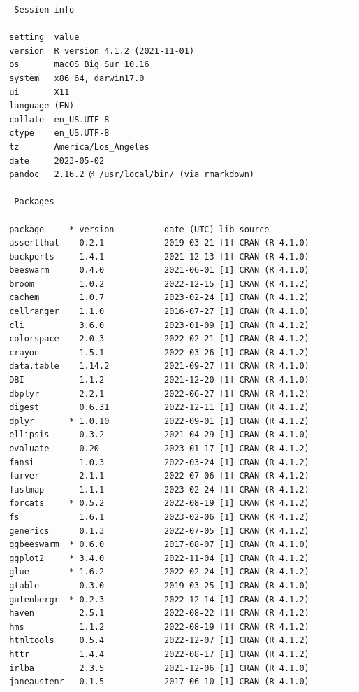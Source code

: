 \documentclass[
]{article}
\begin{document}
\begin{verbatim}
- Session info ---------------------------------------------------------------
 setting  value
 version  R version 4.1.2 (2021-11-01)
 os       macOS Big Sur 10.16
 system   x86_64, darwin17.0
 ui       X11
 language (EN)
 collate  en_US.UTF-8
 ctype    en_US.UTF-8
 tz       America/Los_Angeles
 date     2023-05-02
 pandoc   2.16.2 @ /usr/local/bin/ (via rmarkdown)

- Packages -------------------------------------------------------------------
 package     * version          date (UTC) lib source
 assertthat    0.2.1            2019-03-21 [1] CRAN (R 4.1.0)
 backports     1.4.1            2021-12-13 [1] CRAN (R 4.1.0)
 beeswarm      0.4.0            2021-06-01 [1] CRAN (R 4.1.0)
 broom         1.0.2            2022-12-15 [1] CRAN (R 4.1.2)
 cachem        1.0.7            2023-02-24 [1] CRAN (R 4.1.2)
 cellranger    1.1.0            2016-07-27 [1] CRAN (R 4.1.0)
 cli           3.6.0            2023-01-09 [1] CRAN (R 4.1.2)
 colorspace    2.0-3            2022-02-21 [1] CRAN (R 4.1.2)
 crayon        1.5.1            2022-03-26 [1] CRAN (R 4.1.2)
 data.table    1.14.2           2021-09-27 [1] CRAN (R 4.1.0)
 DBI           1.1.2            2021-12-20 [1] CRAN (R 4.1.0)
 dbplyr        2.2.1            2022-06-27 [1] CRAN (R 4.1.2)
 digest        0.6.31           2022-12-11 [1] CRAN (R 4.1.2)
 dplyr       * 1.0.10           2022-09-01 [1] CRAN (R 4.1.2)
 ellipsis      0.3.2            2021-04-29 [1] CRAN (R 4.1.0)
 evaluate      0.20             2023-01-17 [1] CRAN (R 4.1.2)
 fansi         1.0.3            2022-03-24 [1] CRAN (R 4.1.2)
 farver        2.1.1            2022-07-06 [1] CRAN (R 4.1.2)
 fastmap       1.1.1            2023-02-24 [1] CRAN (R 4.1.2)
 forcats     * 0.5.2            2022-08-19 [1] CRAN (R 4.1.2)
 fs            1.6.1            2023-02-06 [1] CRAN (R 4.1.2)
 generics      0.1.3            2022-07-05 [1] CRAN (R 4.1.2)
 ggbeeswarm  * 0.6.0            2017-08-07 [1] CRAN (R 4.1.0)
 ggplot2     * 3.4.0            2022-11-04 [1] CRAN (R 4.1.2)
 glue        * 1.6.2            2022-02-24 [1] CRAN (R 4.1.2)
 gtable        0.3.0            2019-03-25 [1] CRAN (R 4.1.0)
 gutenbergr  * 0.2.3            2022-12-14 [1] CRAN (R 4.1.2)
 haven         2.5.1            2022-08-22 [1] CRAN (R 4.1.2)
 hms           1.1.2            2022-08-19 [1] CRAN (R 4.1.2)
 htmltools     0.5.4            2022-12-07 [1] CRAN (R 4.1.2)
 httr          1.4.4            2022-08-17 [1] CRAN (R 4.1.2)
 irlba         2.3.5            2021-12-06 [1] CRAN (R 4.1.0)
 janeaustenr   0.1.5            2017-06-10 [1] CRAN (R 4.1.0)

\end{verbatim}
\end{document}
